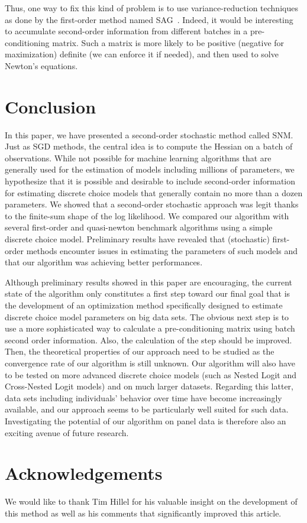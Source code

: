\documentclass[conference]{IEEEtran}
\begin{document}
Thus, one way to fix this kind of problem is to use variance-reduction techniques as done by the first-order method named SAG~\cite{schmidt_minimizing_2013}. Indeed, it would be interesting to accumulate second-order information from different batches in a pre-conditioning matrix. Such a matrix is more likely to be positive (negative for maximization) definite (we can enforce it if needed), and then used to solve Newton's equations. 

\section{Conclusion}
\label{sec:conclusion}

In this paper, we have presented a second-order stochastic method called SNM.  Just as SGD methods, the central idea is to compute the Hessian on a batch of observations. While not possible for machine learning algorithms that are generally used for the estimation of models including millions of parameters,  we hypothesize that it is possible and desirable to include second-order information for estimating discrete choice models that generally contain no more than a dozen parameters. We showed that a second-order stochastic approach was legit thanks to the finite-sum shape of the log likelihood. We compared our algorithm with several first-order and quasi-newton benchmark algorithms using a simple discrete choice model. Preliminary results have revealed that (stochastic) first-order methods encounter issues in estimating the parameters of such models and that our algorithm was achieving better performances.  

Although preliminary results showed in this paper are encouraging, the current state of the algorithm only constitutes a first step toward our final goal that is the development of an optimization method specifically designed to estimate discrete choice model parameters on big data sets. The obvious next step is to use a more sophisticated way to calculate a pre-conditioning matrix using batch second order information. Also, the calculation of the step should be improved. Then, the theoretical properties of our approach need to be studied as the convergence rate of our algorithm is still unknown. Our algorithm will also have to be tested on more advanced discrete choice models (such as Nested Logit and Cross-Nested Logit models) and on much larger datasets. Regarding this latter, data sets including individuals' behavior over time have become increasingly available, and our approach seems to be particularly well suited for such data. Investigating the potential of our algorithm on panel data is therefore also an exciting avenue of future research. 

\section{Acknowledgements} 
\label{sec:acknowledgements}

We would like to thank Tim Hillel for his valuable insight on the development of this method as well as his comments that significantly improved this article.


\end{document}
